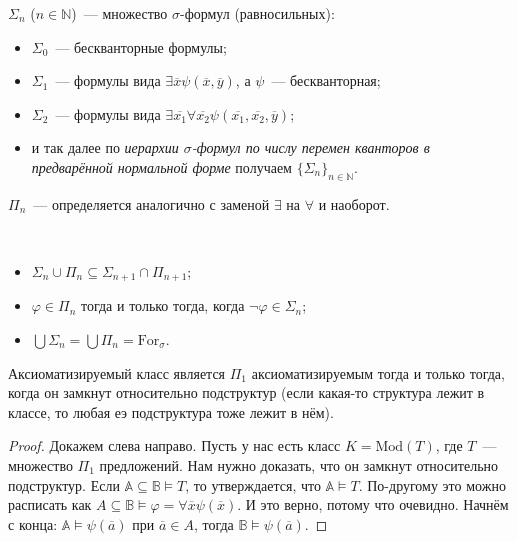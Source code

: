 \begin{definition}
    $\Sigma_n$ ($n \in \mathbb{N}$)~— множество $\sigma$-формул (равносильных): 

    \begin{itemize}
        \item $\Sigma_0$~— бескванторные формулы; 
        \item $\Sigma_1$~— формулы вида $\exists \overline{x} \psi(\overline{x}, \overline{y})$, а $\psi$~— бескванторная; 
        \item $\Sigma_2$~— формулы вида $\exists \overline{x_1} \forall \overline{x_2} \psi(\overline{x_1}, \overline{x_2}, \overline{y})$;
        \item и так далее по \textit{иерархии $\sigma$-формул по числу перемен кванторов в предварённой нормальной форме} получаем $\{\Sigma_n\}_{n \in \mathbb{N}}$.
    \end{itemize}

    $\Pi_n$~—  определяется аналогично с заменой $\exists$ на $\forall$ и наоборот.
\end{definition}

\begin{prop} \ 

    \begin{itemize}
        \item $\Sigma_n \cup \Pi_n \subseteq \Sigma_{n+1} \cap \Pi_{n+1}$; 
        \item $\varphi \in \Pi_n$ тогда и только тогда, когда $\neg \varphi \in \Sigma_n$; 
        \item $\bigcup \Sigma_n = \bigcup \Pi_n = \text{For}_\sigma$.
    \end{itemize}
\end{prop}


\begin{theorem}
    Аксиоматизируемый класс является $\Pi_1$ аксиоматизируемым тогда и только тогда, когда он замкнут относительно подструктур (если какая-то структура лежит в классе, то любая еэ подструктура тоже лежит в нём).
\end{theorem}

\begin{proof}
    Докажем слева направо. Пусть у нас есть класс $K = \text{Mod}(T)$, где $T$~— множество $\Pi_1$ предложений. Нам нужно доказать, что он замкнут относительно подструктур. Если $\mathbb{A}\subseteq \mathbb{B} \models T$, то утверждается, что $\mathbb{A}\models T$. По-другому это можно расписать как $A \subseteq \mathbb{B} \models \varphi = \forall \overline{x} \psi(\overline{x})$. И это верно, потому что очевидно. Начнём с конца: $\mathbb{A}\models \psi(\overline{a})$ при $\overline{a} \in A$, тогда $\mathbb{B} \models \psi(\overline{a})$. 
\end{proof}